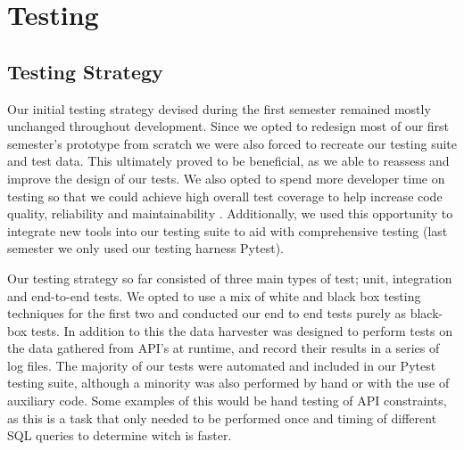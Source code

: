 \documentclass[main.tex]{subfiles}
\begin{document}
\section{Testing}
\label{Testing}

\subsection{Testing Strategy}

Our initial testing strategy devised during the first semester remained mostly unchanged throughout development. Since we opted to redesign most of our first semester’s prototype from scratch we were also forced to recreate our testing suite and test data. This ultimately proved to be beneficial, as we able to reassess and improve the design of our tests. We also opted to spend more developer time on testing so that we could achieve high overall test coverage to help increase code quality, reliability and maintainability \cite{coverageGood}. Additionally, we used this opportunity to integrate new tools into our testing suite to aid with comprehensive testing (last semester we only used our testing harness Pytest\cite{pytest}).

Our testing strategy so far consisted of three main types of test; unit, integration and end-to-end tests. We opted to use a mix of white and black box testing techniques for the first two and conducted our end to end tests purely as black-box tests. In addition to this the data harvester was designed to perform tests on the data gathered from API's at runtime, and record their results in a series of log files. The majority of our tests were automated and included in our Pytest testing suite, although a minority was also performed by hand or with the use of auxiliary code. Some examples of this would be hand testing of API constraints, as this is a task that only needed to be performed once and timing of different SQL queries to determine witch is faster. 
\end{document}
